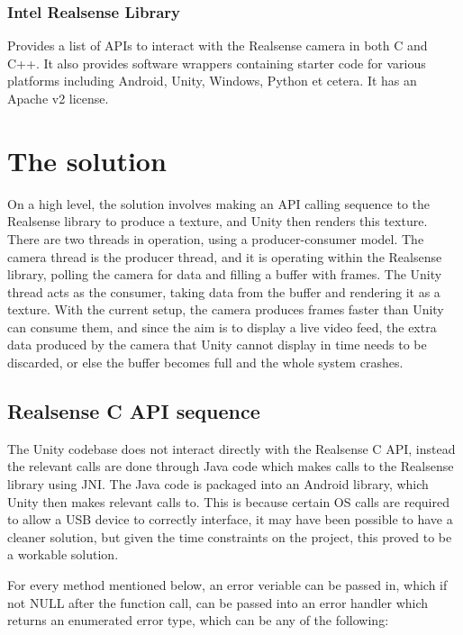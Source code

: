         \subsubsection{Intel Realsense Library}
        Provides a list of APIs to interact with the Realsense camera in both C and C++. It also provides software wrappers containing starter code for various platforms including Android, Unity, Windows, Python et cetera. It has an Apache v2 license.
        

\section{The solution}
    On a high level, the solution involves making an API calling sequence to the Realsense library to produce a texture, and Unity then renders this texture. There are two threads in operation, using a producer-consumer model. The camera thread is the producer thread, and it is operating within the Realsense library, polling the camera for data and filling a buffer with frames. The Unity thread acts as the consumer, taking data from the buffer and rendering it as a texture. With the current setup, the camera produces frames faster than Unity can consume them, and since the aim is to display a live video feed, the extra data produced by the camera that Unity cannot display in time needs to be discarded, or else the buffer becomes full and the whole system crashes.

    \subsection{Realsense C API sequence}
    The Unity codebase does not interact directly with the Realsense C API, instead the relevant calls are done through Java code which makes calls to the Realsense library using JNI. The Java code is packaged into an Android library, which Unity then makes relevant calls to. This is because certain OS calls are required to allow a USB device to correctly interface, it may have been possible to have a cleaner solution, but given the time constraints on the project, this proved to be a workable solution.

    For every method mentioned below, an error veriable can be passed in, which if not NULL after the function call, can be passed into an error handler which returns an enumerated error type, which can be any of the following:

